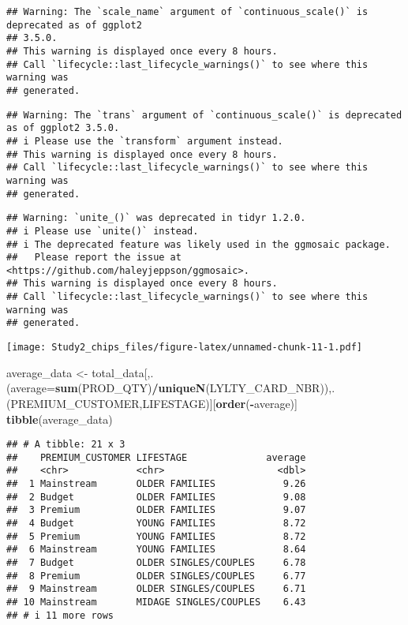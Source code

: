 \documentclass[
]{article}
\newenvironment{Shaded}{\begin{snugshade}}{\end{snugshade}}
\newcommand{\AttributeTok}[1]{\textcolor[rgb]{0.13,0.29,0.53}{#1}}
\newcommand{\FunctionTok}[1]{\textcolor[rgb]{0.13,0.29,0.53}{\textbf{#1}}}
\newcommand{\NormalTok}[1]{#1}
\newcommand{\OtherTok}[1]{\textcolor[rgb]{0.56,0.35,0.01}{#1}}
\newcommand{\SpecialCharTok}[1]{\textcolor[rgb]{0.81,0.36,0.00}{\textbf{#1}}}
\begin{document}
\begin{verbatim}
## Warning: The `scale_name` argument of `continuous_scale()` is deprecated as of ggplot2
## 3.5.0.
## This warning is displayed once every 8 hours.
## Call `lifecycle::last_lifecycle_warnings()` to see where this warning was
## generated.
\end{verbatim}

\begin{verbatim}
## Warning: The `trans` argument of `continuous_scale()` is deprecated as of ggplot2 3.5.0.
## i Please use the `transform` argument instead.
## This warning is displayed once every 8 hours.
## Call `lifecycle::last_lifecycle_warnings()` to see where this warning was
## generated.
\end{verbatim}

\begin{verbatim}
## Warning: `unite_()` was deprecated in tidyr 1.2.0.
## i Please use `unite()` instead.
## i The deprecated feature was likely used in the ggmosaic package.
##   Please report the issue at <https://github.com/haleyjeppson/ggmosaic>.
## This warning is displayed once every 8 hours.
## Call `lifecycle::last_lifecycle_warnings()` to see where this warning was
## generated.
\end{verbatim}

\texttt{[image: Study2\_chips\_files/figure-latex/unnamed-chunk-11-1.pdf]}

\begin{Shaded}
\begin{Highlighting}[]
\NormalTok{average\_data }\OtherTok{\textless{}{-}}\NormalTok{ total\_data[,.(}\AttributeTok{average=}\FunctionTok{sum}\NormalTok{(PROD\_QTY)}\SpecialCharTok{/}\FunctionTok{uniqueN}\NormalTok{(LYLTY\_CARD\_NBR)),.(PREMIUM\_CUSTOMER,LIFESTAGE)][}\FunctionTok{order}\NormalTok{(}\SpecialCharTok{{-}}\NormalTok{average)]}
\FunctionTok{tibble}\NormalTok{(average\_data)}
\end{Highlighting}
\end{Shaded}

\begin{verbatim}
## # A tibble: 21 x 3
##    PREMIUM_CUSTOMER LIFESTAGE              average
##    <chr>            <chr>                    <dbl>
##  1 Mainstream       OLDER FAMILIES            9.26
##  2 Budget           OLDER FAMILIES            9.08
##  3 Premium          OLDER FAMILIES            9.07
##  4 Budget           YOUNG FAMILIES            8.72
##  5 Premium          YOUNG FAMILIES            8.72
##  6 Mainstream       YOUNG FAMILIES            8.64
##  7 Budget           OLDER SINGLES/COUPLES     6.78
##  8 Premium          OLDER SINGLES/COUPLES     6.77
##  9 Mainstream       OLDER SINGLES/COUPLES     6.71
## 10 Mainstream       MIDAGE SINGLES/COUPLES    6.43
## # i 11 more rows
\end{verbatim}
\end{document}
